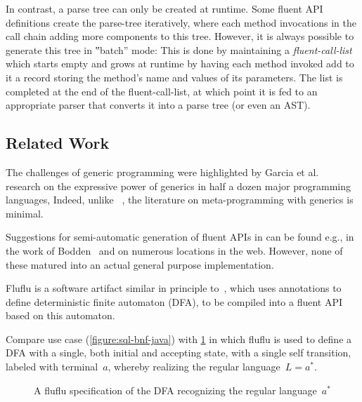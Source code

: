 In contrast, a parse tree can only be created at runtime.
Some fluent API definitions create the parse-tree
iteratively, where each method invocations in the call chain adding
more components to this tree.
However, it is always possible to generate this tree in ‟batch” mode:
This is done by maintaining a \emph{fluent-call-list} which
starts empty and grows at runtime by having each method invoked add to it
a record storing the method's name and values of its parameters.
The list is completed at the end of the fluent-call-list, at which point it is
fed to an appropriate parser that converts it into a parse tree (or even an
AST).

\subsection{Related Work}
The challenges of \Java generic programming were highlighted by Garcia et
al.~\cite{Garcia:Jarvi:Lumsdaine:Siek:Willcock:03} research on the expressive
power of generics in half a dozen major programming languages, 
Indeed, unlike \CC~\cite{Austern:98,Musser:Stepanov:1989,
Backhouse:Jansson:1999, Dehnert:Stepanov:2000,Gil:Gutterman:98,Abrahams:Gurtovoy:04}, the literature on meta-programming with \Java
generics is minimal. 

Suggestions for semi-automatic generation of fluent APIs in \Java can be found
e.g., in the work of Bodden~\cite{Bodden:14} and on numerous locations in the
web. However, none of these matured into an actual general purpose
implementation.  

Fluflu is a software artifact similar
in principle to~\Fajita, which uses \Java annotations to define deterministic finite
automaton (DFA), to be compiled into a fluent API based on this automaton. 

Compare \Fajita use case (\cref{figure:sql-bnf-java}) with \cref{figure:fluflu} in
which fluflu is used to define a DFA with a single, both initial and
accepting state, with a single self transition, labeled
with terminal~$a$, whereby realizing the regular language~$L=a^*$.

\begin{figure}[H]
  \caption{\label{figure:fluflu}
    A fluflu specification of the DFA recognizing the regular language~$a^*$}
\end{figure}
